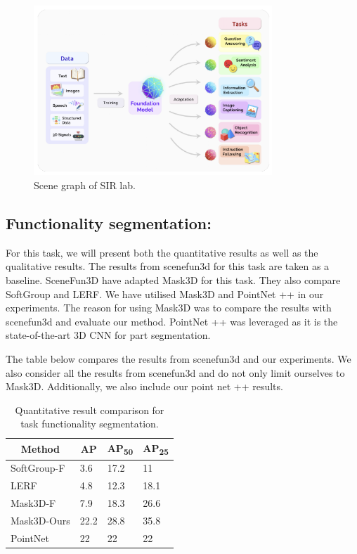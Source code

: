 \begin{figure}[ht!]
    \centering
    \includegraphics[width=0.8\textwidth]{images/FoundationModels.png}
    \caption{Scene graph of SIR lab.}
    \label{fig:result2}
\end{figure}
\subsection{Functionality segmentation:}
For this task, we will present both the quantitative results as well as the qualitative results. The results from scenefun3d for this task are taken as a baseline. 
SceneFun3D have adapted Mask3D for this task. They also compare SoftGroup and LERF. We have utilised Mask3D and PointNet ++ in our experiments. The reason for using 
Mask3D was to compare the results with scenefun3d and evaluate our method. PointNet ++ was leveraged as it is the state-of-the-art 3D CNN for part segmentation.

The table below compares the results from scenefun3d and our experiments. We also consider all the results from scenefun3d and do not only limit ourselves to
Mask3D. Additionally, we also include our point net ++ results.

\begin{longtable}{l|l|l|l}
    \caption{Quantitative result comparison for task functionality segmentation.} \label{tab:quantitativeResults} \\
    \hline \multicolumn{1}{|c|}{\textbf{Method}} & \multicolumn{1}{c|}{\textbf{AP}} & \multicolumn{1}{c|}{\textbf{AP\textsubscript{50}}} & \multicolumn{1}{c|}{\textbf{AP\textsubscript{25}}} \\ \hline
    SoftGroup-F & 3.6 & 17.2 & 11 \\
    LERF & 4.8 & 12.3 & 18.1\\
    Mask3D-F & 7.9 & 18.3 & 26.6\\
    Mask3D-Ours & 22.2 & 28.8 & 35.8\\
    PointNet & 22 & 22 & 22\\
    \hline
\end{longtable}
    
